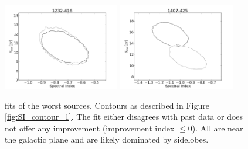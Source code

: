 \documentclass[preprint]{aastex}
\begin{document}
\begin{figure}[htbp]
\begin{center}
\includegraphics[width=2in]{plots/1232-416_SI_MCMC.png} %
\includegraphics[width=2in]{plots/1407-425_SI_MCMC.png} %
\end{center}
\caption{fits of the worst sources. Contours as described in Figure \ref{fig:SI_contour_1}. The fit either disagrees
with past data or does not offer any improvement (improvement index $\le 0$). All are near
the galactic plane and are likely dominated by sidelobes.
}\label{fig:SI_contour_bad}
\end{figure}
\end{document}

